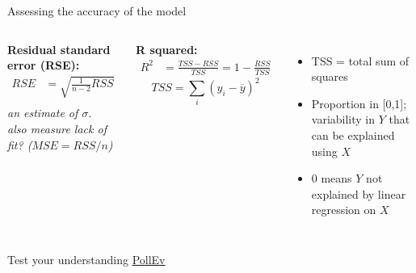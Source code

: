 \documentclass[aspectratio=169,usenames,dvipsnames]{beamer}
\newcommand{\InstructorNotes}[1]{\textit{\color{orange}#1}}
\newcommand{\InstructorList}[1]{
\begin{itemize}
	\color{orange}
	#1
\end{itemize}
}
\begin{document}
\begin{frame}[c]{Assessing the accuracy of the model}
	\centering
\begin{columns}
\textbf{Residual standard error (RSE):}
\begin{align*}
	RSE &= \sqrt{ \frac{1}{n-2} RSS}\\
\end{align*}
\InstructorNotes{an estimate of $\sigma$. \\also measure lack of fit? ($MSE=RSS/n$) }




\textbf{R squared:}
\begin{align*}
	R^2 &= \frac{TSS-RSS}{TSS} = 1-\frac{RSS}{TSS}
\end{align*}
\begin{equation*}
	TSS = \sum_i (y_i - \overline y)^2
\end{equation*}
\InstructorList{
\item TSS = total sum of squares
\item Proportion in [0,1]; variability in $Y$ that can be explained using $X$
\item 0 means $Y$ not explained by linear regression on $X$}
\end{columns}
\vspace{\fill}
Test your understanding \href{https://PollEv.com/multiple_choice_polls/bSq5msaRQMQ3WhZ5w4UUz/respond}{PollEv}
\end{frame}



\end{document}
